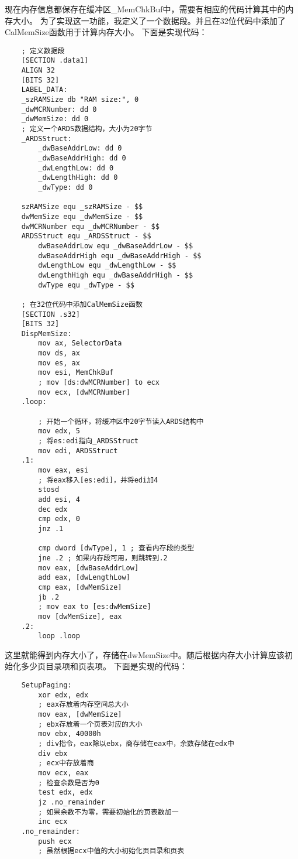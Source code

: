 \documentclass[a4paper,left=2.5cm,right=2.5cm,11pt]{article}
\begin{document}
	现在内存信息都保存在缓冲区\_MemChkBuf中，需要有相应的代码计算其中的内存大小。
	为了实现这一功能，我定义了一个数据段。并且在32位代码中添加了CalMemSize函数用于计算内存大小。
	下面是实现代码：
	\begin{lstlisting}
	; 定义数据段
	[SECTION .data1]
	ALIGN 32
	[BITS 32]
	LABEL_DATA:
	_szRAMSize db "RAM size:", 0
	_dwMCRNumber: dd 0
	_dwMemSize: dd 0
	; 定义一个ARDS数据结构，大小为20字节
	_ARDSStruct:
		_dwBaseAddrLow: dd 0
		_dwBaseAddrHigh: dd 0
		_dwLengthLow: dd 0
		_dwLengthHigh: dd 0
		_dwType: dd 0
		
	szRAMSize equ _szRAMSize - $$
	dwMemSize equ _dwMemSize - $$
	dwMCRNumber equ _dwMCRNumber - $$
	ARDSStruct equ _ARDSStruct - $$
		dwBaseAddrLow equ _dwBaseAddrLow - $$
		dwBaseAddrHigh equ _dwBaseAddrHigh - $$
		dwLengthLow equ _dwLengthLow - $$
		dwLengthHigh equ _dwBaseAddrHigh - $$
		dwType equ _dwType - $$
	
	; 在32位代码中添加CalMemSize函数
	[SECTION .s32]
	[BITS 32]
	DispMemSize:
		mov ax, SelectorData
		mov ds, ax
		mov es, ax
		mov esi, MemChkBuf
		; mov [ds:dwMCRNumber] to ecx
		mov ecx, [dwMCRNumber]
	.loop:

		; 开始一个循环，将缓冲区中20字节读入ARDS结构中
		mov edx, 5
		; 将es:edi指向_ARDSStruct
		mov edi, ARDSStruct
	.1:
		mov eax, esi
		; 将eax移入[es:edi]，并将edi加4
		stosd
		add esi, 4
		dec edx
		cmp edx, 0
		jnz .1

		cmp dword [dwType], 1 ; 查看内存段的类型
		jne .2 ; 如果内存段可用，则跳转到.2
		mov eax, [dwBaseAddrLow]
		add eax, [dwLengthLow]
		cmp eax, [dwMemSize]
		jb .2
		; mov eax to [es:dwMemSize]
		mov [dwMemSize], eax
	.2:
		loop .loop
	\end{lstlisting}

	这里就能得到内存大小了，存储在dwMemSize中。随后根据内存大小计算应该初始化多少页目录项和页表项。
	下面是实现的代码：
	\begin{lstlisting}
	SetupPaging:
		xor edx, edx
		; eax存放着内存空间总大小
		mov eax, [dwMemSize]
		; ebx存放着一个页表对应的大小
		mov ebx, 40000h
		; div指令，eax除以ebx，商存储在eax中，余数存储在edx中
		div ebx
		; ecx中存放着商
		mov ecx, eax
		; 检查余数是否为0
		test edx, edx
		jz .no_remainder
		; 如果余数不为零，需要初始化的页表数加一
		inc ecx
	.no_remainder:
		push ecx
		; 虽然根据ecx中值的大小初始化页目录和页表
	\end{lstlisting}
\end{document}
